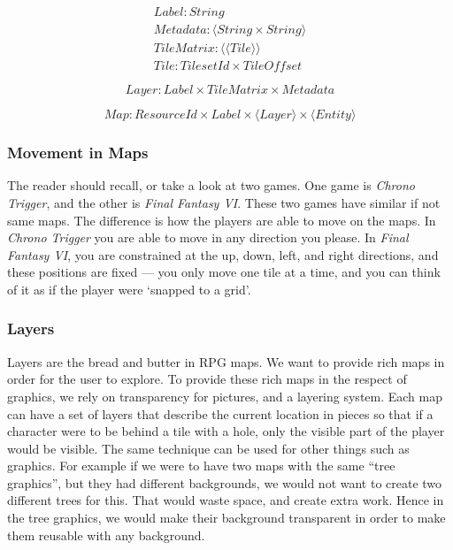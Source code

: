 \begin{equation}
\begin{split} \label{eq:bigmapspec}
Label\colon String \\
Metadata\colon \langle String \times String \rangle \\
TileMatrix\colon \langle \langle Tile \rangle \rangle \\
Tile\colon TilesetId \times TileOffset
\end{split}
\end{equation}

\begin{equation}
Layer\colon Label \times TileMatrix \times Metadata
\end{equation}

\begin{equation}
Map\colon ResourceId \times Label \times \langle Layer \rangle \times \langle Entity \rangle
\end{equation}

\subsubsection{Movement in Maps}

The reader should recall, or take a look at two games. One game is
\textit{Chrono Trigger}, and the other is \textit{Final Fantasy VI}. These two
games have similar if not same maps. The difference is how the players are able
to move on the maps. In \textit{Chrono Trigger} you are able to move in any
direction you please. In \textit{Final Fantasy VI}, you are constrained at the
up, down, left, and right directions, and these positions are fixed --- you only
move one tile at a time, and you can think of it as if the player were `snapped
to a grid'.

\subsubsection{Layers}

Layers are the bread and butter in RPG maps. We want to provide rich maps in
order for the user to explore. To provide these rich maps in the respect of
graphics, we rely on transparency for pictures, and a layering system. Each
map can have a set of layers that describe the current location in pieces so
that if a character were to be behind a tile with a hole, only the visible part
of the player would be visible. The same technique can be used for other things
such as graphics. For example if we were to have two maps with the same ``tree
graphics'', but they had different backgrounds, we would not want to create two
different trees for this. That would waste space, and create extra work. Hence
in the tree graphics, we would make their background transparent in order to
make them reusable with any background.


